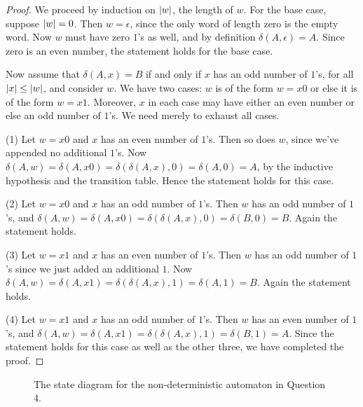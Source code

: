 \begin{proof}
We proceed by induction on $\left|w\right|$, the length of $w$. For the base case, suppose $\left|w\right| = 0$. Then $w = \epsilon$, since the only word of length zero is the empty word. Now $w$ must have zero $1$'s as well, and by definition $\delta(A, \epsilon) = A$. Since zero is an even number, the statement holds for the base case.

Now assume that $\delta(A, x) = B$ if and only if $x$ has an odd number of $1$'s, for all $\left|x\right| \leq \left|w\right|$, and consider $w$. 
We have two cases: $w$ is of the form $w = x0$ or else it is of the form $w = x1$. 
Moreover, $x$ in each case may have either an even number or else an odd number of $1$'s. 
We need merely to exhaust all cases.
 
(1) Let $w = x0$ and $x$ has an even number of $1$'s. 
Then so does $w$, since we've appended no additional $1$'s. 
Now $\delta(A, w) = \delta(A, x0) = \delta(\delta(A, x), 0) = \delta(A, 0) = A$, by the inductive hypothesis and the transition table. 
Hence the statement holds for this case. 

(2) Let $w = x0$ and $x$ has an odd number of $1$'s. 
Then $w$ has an odd number of $1$'s, and $\delta(A, w) = \delta(A, x0) = \delta(\delta(A, x), 0) = \delta(B, 0) = B$. 
Again the statement holds. 

(3) Let $w = x1$ and $x$ has an even number of $1$'s. 
Then $w$ has an odd number of $1$'s since we just added an additional $1$. 
Now $\delta(A, w) = \delta(A, x1) = \delta(\delta(A, x), 1) = \delta(A, 1) = B$. 
Again the statement holds. 

(4) Let $w = x1$ and $x$ has an odd number of $1$'s. 
Then $w$ has an even number of $1$'s, and $\delta(A, w) = \delta(A, x1) = \delta(\delta(A, x), 1) = \delta(B, 1) = A$. 
Since the statement holds for this case as well as the other three, we have completed the proof.
\end{proof}
\newpage
{}
\begin{figure}[ht]
\caption{The state diagram for the non-deterministic automaton in Question 4.}
\end{figure}
